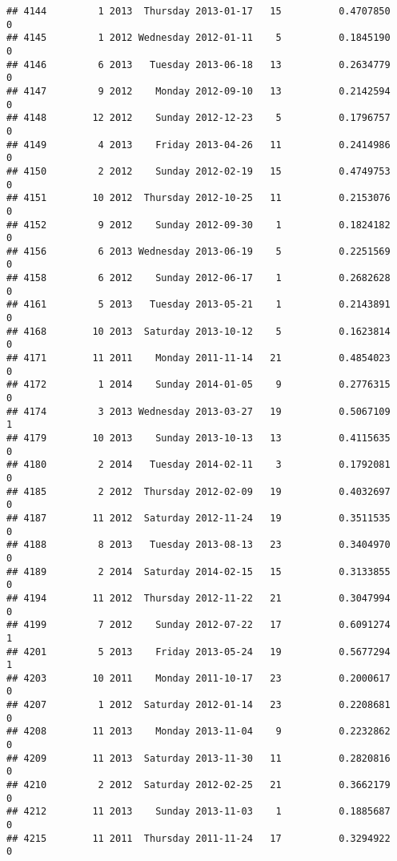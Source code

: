 \documentclass[
]{article}
\begin{document}
\begin{verbatim}
## 4144         1 2013  Thursday 2013-01-17   15          0.4707850             0
## 4145         1 2012 Wednesday 2012-01-11    5          0.1845190             0
## 4146         6 2013   Tuesday 2013-06-18   13          0.2634779             0
## 4147         9 2012    Monday 2012-09-10   13          0.2142594             0
## 4148        12 2012    Sunday 2012-12-23    5          0.1796757             0
## 4149         4 2013    Friday 2013-04-26   11          0.2414986             0
## 4150         2 2012    Sunday 2012-02-19   15          0.4749753             0
## 4151        10 2012  Thursday 2012-10-25   11          0.2153076             0
## 4152         9 2012    Sunday 2012-09-30    1          0.1824182             0
## 4156         6 2013 Wednesday 2013-06-19    5          0.2251569             0
## 4158         6 2012    Sunday 2012-06-17    1          0.2682628             0
## 4161         5 2013   Tuesday 2013-05-21    1          0.2143891             0
## 4168        10 2013  Saturday 2013-10-12    5          0.1623814             0
## 4171        11 2011    Monday 2011-11-14   21          0.4854023             0
## 4172         1 2014    Sunday 2014-01-05    9          0.2776315             0
## 4174         3 2013 Wednesday 2013-03-27   19          0.5067109             1
## 4179        10 2013    Sunday 2013-10-13   13          0.4115635             0
## 4180         2 2014   Tuesday 2014-02-11    3          0.1792081             0
## 4185         2 2012  Thursday 2012-02-09   19          0.4032697             0
## 4187        11 2012  Saturday 2012-11-24   19          0.3511535             0
## 4188         8 2013   Tuesday 2013-08-13   23          0.3404970             0
## 4189         2 2014  Saturday 2014-02-15   15          0.3133855             0
## 4194        11 2012  Thursday 2012-11-22   21          0.3047994             0
## 4199         7 2012    Sunday 2012-07-22   17          0.6091274             1
## 4201         5 2013    Friday 2013-05-24   19          0.5677294             1
## 4203        10 2011    Monday 2011-10-17   23          0.2000617             0
## 4207         1 2012  Saturday 2012-01-14   23          0.2208681             0
## 4208        11 2013    Monday 2013-11-04    9          0.2232862             0
## 4209        11 2013  Saturday 2013-11-30   11          0.2820816             0
## 4210         2 2012  Saturday 2012-02-25   21          0.3662179             0
## 4212        11 2013    Sunday 2013-11-03    1          0.1885687             0
## 4215        11 2011  Thursday 2011-11-24   17          0.3294922             0

\end{verbatim}
\end{document}
